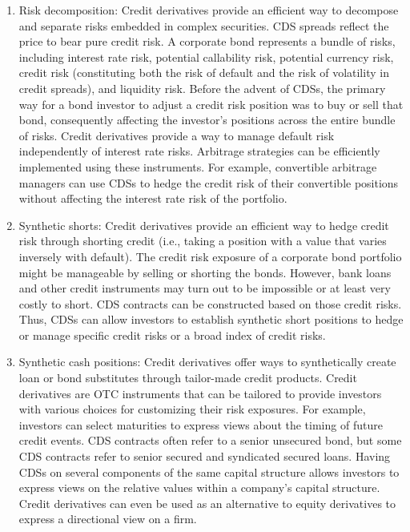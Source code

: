 \documentclass[11pt]{article}
\begin{document}
\begin{enumerate}
  \item Risk decomposition: Credit derivatives provide an efficient way to decompose and separate risks embedded in complex securities. CDS spreads reflect the price to bear pure credit risk. A corporate bond represents a bundle of risks, including interest rate risk, potential callability risk, potential currency risk, credit risk (constituting both the risk of default and the risk of volatility in credit spreads), and liquidity risk. Before the advent of CDSs, the primary way for a bond investor to adjust a credit risk position was to buy or sell that bond, consequently affecting the investor's positions across the entire bundle of risks. Credit derivatives provide a way to manage default risk independently of interest rate risks. Arbitrage strategies can be efficiently implemented using these instruments. For example, convertible arbitrage managers can use CDSs to hedge the credit risk of their convertible positions without affecting the interest rate risk of the portfolio.

  \item Synthetic shorts: Credit derivatives provide an efficient way to hedge credit risk through shorting credit (i.e., taking a position with a value that varies inversely with default). The credit risk exposure of a corporate bond portfolio might be manageable by selling or shorting the bonds. However, bank loans and other credit instruments may turn out to be impossible or at least very costly to short. CDS contracts can be constructed based on those credit risks. Thus, CDSs can allow investors to establish synthetic short positions to hedge or manage specific credit risks or a broad index of credit risks.

  \item Synthetic cash positions: Credit derivatives offer ways to synthetically create loan or bond substitutes through tailor-made credit products. Credit derivatives are OTC instruments that can be tailored to provide investors with various choices for customizing their risk exposures. For example, investors can select maturities to express views about the timing of future credit events. CDS contracts often refer to a senior unsecured bond, but some CDS contracts refer to senior secured and syndicated secured loans. Having CDSs on several components of the same capital structure allows investors to express views on the relative values within a company's capital structure. Credit derivatives can even be used as an alternative to equity derivatives to express a directional view on a firm.


\end{enumerate}
\end{document}
